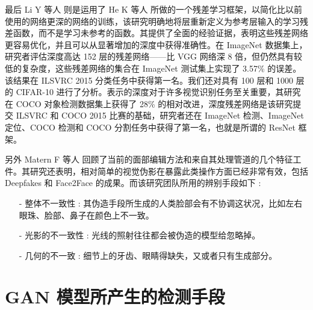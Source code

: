 最后 Li Y 等人 \cite{li2018exposing} 则是运用了 He K 等人 \cite{he2016deep}所做的一个残差学习框架，以简化比以前使用的网络更深的网络的训练，该研究明确地将层重新定义为参考层输入的学习残差函数，而不是学习未参考的函数。其提供了全面的经验证据，表明这些残差网络更容易优化，并且可以从显著增加的深度中获得准确性。在 ImageNet 数据集上，研究者评估深度高达 152 层的残差网络——比 VGG 网络深 8 倍，但仍然具有较低的复杂度，这些残差网络的集合在 ImageNet 测试集上实现了 3.57\% 的误差。该结果在 ILSVRC 2015 分类任务中获得第一名。我们还对具有 100 层和 1000 层的 CIFAR-10 进行了分析。表示的深度对于许多视觉识别任务至关重要，其研究在 COCO 对象检测数据集上获得了 28\% 的相对改进，深度残差网络是该研究提交 ILSVRC 和 COCO 2015 比赛的基础，研究者还在 ImageNet 检测、ImageNet 定位、COCO 检测和 COCO 分割任务中获得了第一名，也就是所谓的 ResNet 框架。

另外 Matern F 等人 \cite{matern2019exploiting} 回顾了当前的面部编辑方法和来自其处理管道的几个特征工件。其研究还表明，相对简单的视觉伪影在暴露此类操作方面已经非常有效，包括 Deepfakes 和 Face2Face 的成果。而该研究团队所用的辨别手段如下 :

\begin{itemize}
\item [-] 整体不一致性 : 其伪造手段所生成的人类脸部会有不协调这状况，比如左右眼珠、脸部、鼻子在颜色上不一致。
\item [-] 光影的不一致性 : 光线的照射往往都会被伪造的模型给忽略掉。
\item [-] 几何的不一致 : 细节上的牙齿、眼睛得缺失，又或者只有生成部分。
\end{itemize}

\section{ GAN 模型所产生的检测手段}

